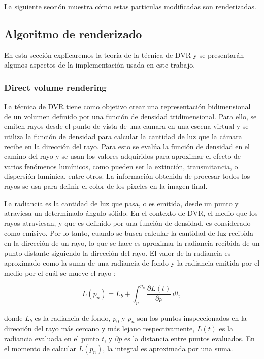 \documentclass[oneside,a4paper,spanish,links]{amca}
\begin{document}
La siguiente secci\'on muestra c\'omo estas particulas modificadas son renderizadas.

\subsection{Algoritmo de renderizado}

En esta sección explicaremos la teoría de la técnica de DVR y se
presentarán algunos aspectos de la implementación usada en este
trabajo.

\subsubsection{Direct volume rendering}

La técnica de DVR tiene como objetivo crear una representación
bidimensional de un vo\-lu\-men definido por una función de densidad
tridimensional. Para ello, se emiten rayos desde el punto de vista de
una camara en una escena virtual y se utiliza la función de densidad
para calcular la cantidad de luz que la cámara recibe en la dirección
del rayo. Para esto se evalúa la función de densidad en el camino del
rayo y se usan los valores adquiridos para aproximar el efecto de
varios fenómenos lumínicos, como pueden ser la extinción,
transmitancia, o dispersión lumínica, entre otros. La información
obtenida de procesar todos los rayos se usa para definir el color de
los pixeles en la imagen final.

La radiancia es la cantidad de luz que pasa, o es emitida, desde un
punto y atraviesa un determinado ángulo sólido. En el contexto de DVR,
el medio que los rayos atraviesan, y que es definido por una función
de densidad, es considerado como emisivo. Por lo tanto, cuando se
busca calcular la cantidad de luz recibida en la dirección de un rayo,
lo que se hace es aproximar la radiancia recibida de un punto distante
siguiendo la dirección del rayo. El valor de la radiancia es
aproximado como la suma de una radiancia de fondo y la radiancia
emitida por el medio por el cuál se mueve el rayo \citep{Kratz2006} :

\begin{equation} \label{eq:general_radiance}  
  L(p_n) = L_b + \int_{p_0}^{p_n} \frac{\partial L(t)}{\partial p} \, dt,
\end{equation}

\noindent donde $L_b$ es la radiancia de fondo, $p_0$ y $p_n$ son los
puntos inspeccionados en la dirección del rayo más cercano y más
lejano respectivamente, $L(t)$ es la radiancia evaluada en el punto
$t$, y $\partial p$ es la distancia entre puntos evaluados. En el
momento de calcular $L(p_n)$, la integral es aproximada por una suma.
\end{document}
